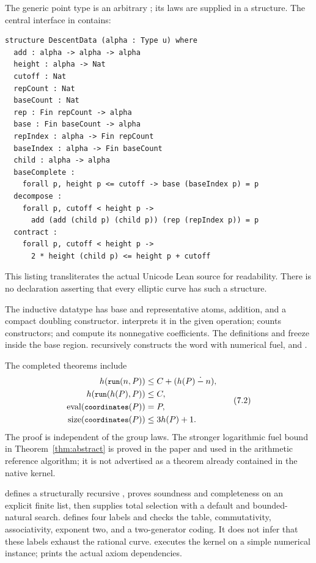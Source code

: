 The generic point type is an arbitrary ; its laws are supplied
in a structure. The central interface in  contains:
\begin{lstlisting}
structure DescentData (alpha : Type u) where
  add : alpha -> alpha -> alpha
  height : alpha -> Nat
  cutoff : Nat
  repCount : Nat
  baseCount : Nat
  rep : Fin repCount -> alpha
  base : Fin baseCount -> alpha
  repIndex : alpha -> Fin repCount
  baseIndex : alpha -> Fin baseCount
  child : alpha -> alpha
  baseComplete :
    forall p, height p <= cutoff -> base (baseIndex p) = p
  decompose :
    forall p, cutoff < height p ->
      add (add (child p) (child p)) (rep (repIndex p)) = p
  contract :
    forall p, cutoff < height p ->
      2 * height (child p) <= height p + cutoff
\end{lstlisting}
This listing transliterates the actual Unicode Lean source for readability.
There is no declaration asserting that every elliptic curve has such a
structure.

The inductive datatype  has base and representative atoms,
addition, and a compact doubling constructor.  interprets
it in the given operation;  counts constructors;
 and  compute its nonnegative coefficients.
The definitions  and  freeze inside the base region.
 recursively constructs the word with numerical fuel, and
.

The completed theorems include
\[
\begin{split}
 h(\texttt{\small run}(n,P))&\le C+(h(P)\mathbin{\mathord{\dot-}} n),\\
 h(\texttt{\small run}(h(P),P))&\le C,\\
 \operatorname{eval}(\texttt{\small coordinates}(P))&=P,\\
 \operatorname{size}(\texttt{\small coordinates}(P))&\le3h(P)+1.
\end{split}
\tag{7.2}
\]
The proof is independent of the group laws. The stronger logarithmic
fuel bound in Theorem~\ref{thm:abstract} is proved in the paper and used
in the arithmetic reference algorithm; it is not advertised as a theorem
already contained in the native kernel.

 defines a structurally recursive ,
proves soundness and completeness on an explicit finite list, then supplies
total selection with a default and bounded-natural search.
 defines four labels and checks the table,
commutativity, associativity, exponent two, and a two-generator coding.
It does not infer that these labels exhaust the rational curve.
 executes the kernel on a simple numerical
instance;  prints the actual axiom dependencies.

